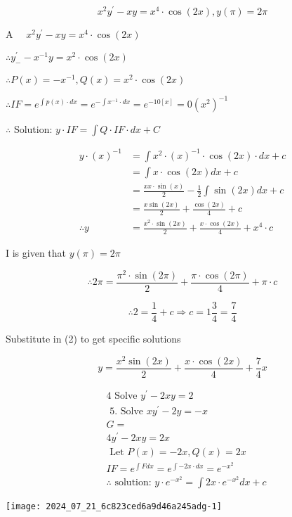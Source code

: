 \documentclass[12pt, a4paper]{article}
\begin{document}
$$
x^{2} y^{\prime}-x y=x^{4} \cdot \cos (2 x), y(\pi)=2 \pi
$$

A $\quad x^{2} y^{\prime}-x y=x^{4} \cdot \cos (2 x)$

$\therefore y_{-}^{\prime}-x^{-1} y=x^{2} \cdot \cos (2 x)$

$\therefore P(x)=-x^{-1}, Q(x)=x^{2} \cdot \cos (2 x)$

$\therefore I F=e^{\int p(x) \cdot d x}=e^{-\int x^{-1} \cdot d x}=e^{-10[x]}=0\left(x^{2}\right)^{-1}$

$\therefore$ Solution: $y \cdot I F=\int Q \cdot I F \cdot d x+C$

$$
\begin{aligned}
y \cdot(x)^{-1} & =\int x^{2} \cdot(x)^{-1} \cdot \cos (2 x) \cdot d x+c \\
& =\int x \cdot \cos (2 x) d x+c \\
& =\frac{x x \cdot \sin (x)}{2}-\frac{1}{2} \int \sin (2 x) d x+c \\
& =\frac{x \sin (2 x)}{2}+\frac{\cos (2 x)}{4}+c \\
\therefore y & =\frac{x^{2} \cdot \sin (2 x)}{2}+\frac{x \cdot \cos (2 x)}{4}+x^{4} \cdot c
\end{aligned}
$$

I is given that $y(\pi)=2 \pi$

$$
\therefore 2 \pi=\frac{\pi^{2} \cdot \sin (2 \pi)}{2}+\frac{\pi \cdot \cos (2 \pi)}{4}+\pi \cdot c
$$

$$
\therefore 2=\frac{1}{4}+c \Rightarrow c=1 \frac{3}{4}=\frac{7}{4}
$$

Substitute in (2) to get specific solutions

$$
y=\frac{x^{2} \sin (2 x)}{2}+\frac{x \cdot \cos (2 x)}{4}+\frac{7}{4} x
$$

$$
\begin{aligned}
& 4 \text { Solve } y^{\prime}-2 x y=2 \\
& \text { 5. Solve } x y^{\prime}-2 y=-x \\
& G= \\
& 4 y^{\prime}-2 x y=2 x \\
& \text { Let } P(x)=-2 x, Q(x)=2 x \\
& I F=e^{\int F d x}=e^{\int-2 x \cdot d x}=e^{-x^{2}} \\
& \therefore \text { solution: } y \cdot e^{-x^{2}}=\int 2 x \cdot e^{-x^{2}} d x+c
\end{aligned}
$$

\begin{center}
\texttt{[image: 2024\_07\_21\_6c823ced6a9d46a245adg-1]}
\end{center}
\end{document}
